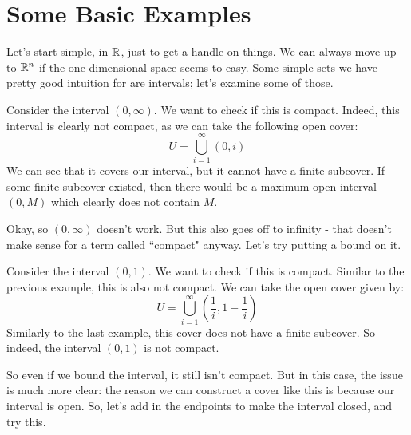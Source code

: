 \documentclass{article}
\begin{document}
\section{Some Basic Examples}

Let's start simple, in $ \mathbb{R} $, just to get a handle on things.
We can always move up to $ \mathbb{R}^{n} $ if the one-dimensional space seems to easy.
Some simple sets we have pretty good intuition for are intervals; let's examine some of those.

\begin{xmp}
    Consider the interval $ (0, \infty) $. We want to check if this is compact. \vsp
    Indeed, this interval is clearly not compact, as we can take the following open cover:
    \begin{equation*}
        U = \bigcup_{i=1}^{\infty} (0, i)
    \end{equation*}
    We can see that it covers our interval, but it cannot have a finite subcover.
    If some finite subcover existed, then there would be a maximum open
    interval $ (0, M) $ which clearly does not contain $ M $.
\end{xmp}

Okay, so $ (0, \infty) $ doesn't work. But this also goes off to infinity - that doesn't make sense
for a term called ``compact" anyway. Let's try putting a bound on it.

\begin{xmp}
    Consider the interval $ (0, 1) $. We want to check if this is compact. \vsp
    Similar to the previous example, this is also not compact.
    We can take the open cover given by:
    \begin{equation*}
        U = \bigcup_{i=1}^{\infty} \left( \frac{1}{i}, 1 - \frac{1}{i} \right)
    \end{equation*}
    Similarly to the last example, this cover does not have a finite subcover.
    So indeed, the interval $ (0, 1) $ is not compact.
\end{xmp}

So even if we bound the interval, it still isn't compact.
But in this case, the issue is much more clear: the reason we can construct a cover like this
is because our interval is open.
So, let's add in the endpoints to make the interval closed, and try this.
\end{document}
